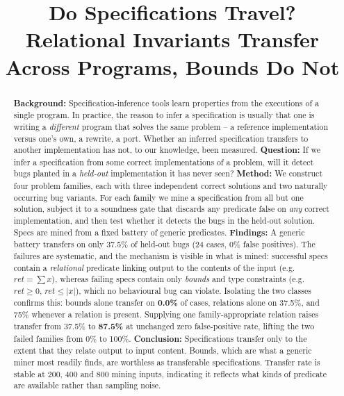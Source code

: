 \documentclass[conference]{IEEEtran}
\begin{document}
\title{Do Specifications Travel?\\Relational Invariants Transfer Across Programs, Bounds Do Not}

\author{
}

\maketitle

\begin{abstract}
\textbf{Background:} Specification-inference tools learn properties from the executions of
a single program. In practice, the reason to infer a specification is usually that one is
writing a \emph{different} program that solves the same problem -- a reference
implementation versus one's own, a rewrite, a port. Whether an inferred specification
transfers to another implementation has not, to our knowledge, been measured.
\textbf{Question:} If we infer a specification from some correct implementations of a
problem, will it detect bugs planted in a \emph{held-out} implementation it has never seen?
\textbf{Method:} We construct four problem families, each with three independent correct
solutions and two naturally occurring bug variants. For each family we mine a
specification from all but one solution, subject it to a soundness gate that discards any
predicate false on \emph{any} correct implementation, and then test whether it detects the
bugs in the held-out solution. Specs are mined from a fixed battery of generic predicates.
\textbf{Findings:} A generic battery transfers on only 37.5\% of held-out bugs (24 cases,
0\% false positives). The failures are systematic, and the mechanism is visible in what is
mined: successful specs contain a \emph{relational} predicate linking output to the
contents of the input (e.g.\ $\mathit{ret} = \sum x$), whereas failing specs contain only
\emph{bounds} and type constraints (e.g.\ $\mathit{ret} \ge 0$, $\mathit{ret} \le |x|$),
which no behavioural bug can violate. Isolating the two classes confirms this: bounds alone
transfer on \textbf{0.0\%} of cases, relations alone on 37.5\%, and 75\% whenever a
relation is present. Supplying one family-appropriate relation raises transfer from 37.5\%
to \textbf{87.5\%} at unchanged zero false-positive rate, lifting the two failed families
from 0\% to 100\%.
\textbf{Conclusion:} Specifications transfer only to the extent that they relate output to
input content. Bounds, which are what a generic miner most readily finds, are worthless as
transferable specifications. Transfer rate is stable at 200, 400 and 800 mining inputs,
indicating it reflects what kinds of predicate are available rather than sampling noise.
\end{abstract}
\end{document}
